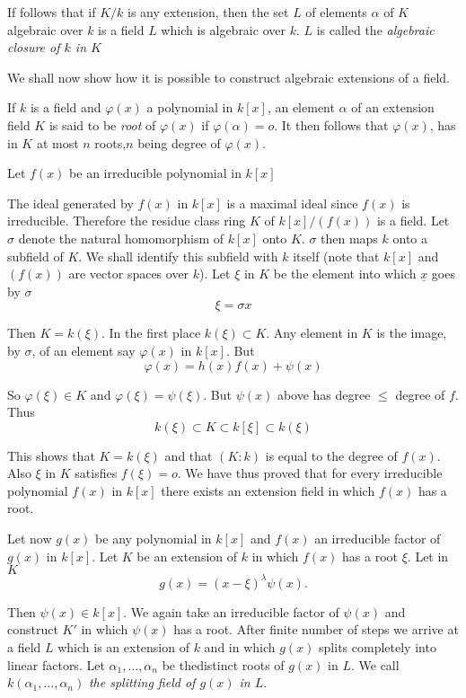 If follows that if $K/k$ is any extension, then the set $L$ of elements
$\alpha$ of $K$ algebraic over $k$ is a field $L$ which is algebraic
over $k$. $L$ is called the \textit{algebraic closure of $k$ in $K$} 

We shall now show how it is possible to construct algebraic extensions
of a field. 

If $k$ is a field and $\varphi (x)$ a polynomial in $k[x]$, an element
$\alpha$ of an extension field $K$ is said to be \textit{root} of
$\varphi(x) $ if $\varphi (\alpha) = o$. It then follows that
$\varphi(x)$, has in $K$ at most $n$ roots,\pageoriginale $n$ being
degree of $\varphi (x)$.  

Let $f(x)$ be an irreducible polynomial in $k[x]$

The ideal generated by $f(x)$ in $k[x]$ is a maximal ideal since
$f(x)$ is 
irreducible. Therefore the residue class ring $K$ of $k[x]/ (f(x))$ is
a field. Let $\sigma$ denote the  natural homomorphism of $k[x]$ onto
$K$. $\sigma$ then maps $k$ onto a subfield of $K$. We shall identify
this subfield with $k$ itself (note that $k[x]$ and $(f(x))$ are
vector spaces over $k$). Let $\xi$ in $K$ be the element into which
$\underline{x}$ goes by $\sigma$ 
$$
\xi = \sigma x
$$

Then $K = k(\xi)$. In the first place $k (\xi) \subset K$. Any element
in $K$ is the image, by $\sigma$, of an element say $\varphi (x)$ in
$k[x]$. But  
$$
\varphi (x) = h(x) f(x) + \psi(x)
$$ 

So $\varphi (\xi) \in K$ and $\varphi (\xi) = \psi (\xi)$. But $\psi
(x)$ above has degree $\leq $ degree of $f$. Thus  
$$
k(\xi) \subset K \subset k[\xi] \subset k (\xi)
$$

This shows that $K = k(\xi)$ and that $(K : k)$ is equal to the degree
of $f(x)$. Also $\xi$ in $K$ satisfies $f(\xi) =o$. We have thus
proved  that for every irreducible polynomial  $f(x)$ in $k[x]$ there
exists  an extension field in which  $f(x)$ has a root. 

Let now  $g(x)$ be any polynomial in $k[x]$ and  $f(x)$ an irreducible
factor of  $g(x)$ in $k[x]$. Let $K$ be an extension of $k$ in which
$f(x)$ has a root $\xi$. Let in $K$ 
$$
g(x) = (x - \xi)^{\lambda}\psi (x).
$$

Then $\psi (x) \in k[x]$. We again take an irreducible factor of $\psi
(x)$ and construct $K'$ in which $\psi(x)$ has a root. After  finite
number of steps we arrive at a field $L$ which is an extension of $k$
and in which   $g(x)$ splits completely into linear factors. Let
$\alpha _1 , \ldots, \alpha _n$  be the\pageoriginale distinct roots
of  $g(x)$ in $L$. We call $k(\alpha_1 ,\ldots , \alpha_n)$
\textit{the splitting   field of  $g(x)$ in $L$}.  

